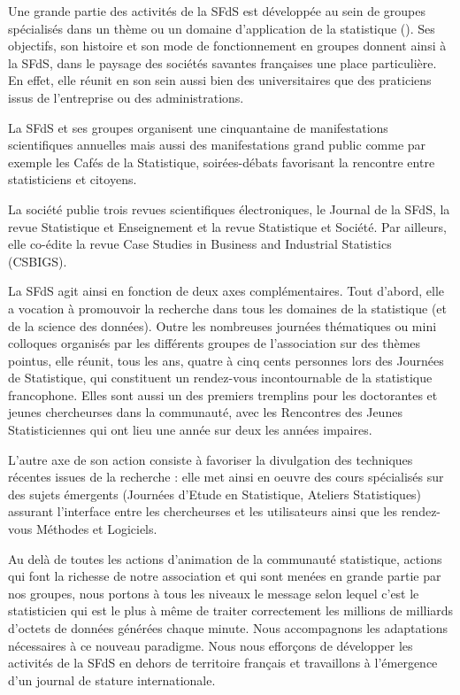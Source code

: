 Une grande partie des activit\'es de la SFdS est d\'evelopp\'ee au sein de groupes sp\'ecialis\'es dans un th\`eme ou un domaine d'application de la statistique (). Ses objectifs, son histoire et son mode de fonctionnement en groupes donnent ainsi \`a la SFdS, dans le paysage des soci\'et\'es savantes fran\c{c}aises une place particuli\`ere. En effet, elle r\'eunit en son sein aussi bien des universitaires que des praticiens issus de l'entreprise ou des administrations.

La SFdS et ses groupes organisent une cinquantaine de manifestations scientifiques annuelles mais aussi des manifestations grand public comme par exemple les Caf\'es de la Statistique, soir\'ees-d\'ebats favorisant la rencontre entre statisticiens et citoyens.

La soci\'et\'e publie trois revues scientifiques \'electroniques, le Journal de la SFdS, la revue Statistique et Enseignement et la revue Statistique 
et Soci\'et\'e. Par ailleurs, elle co-\'edite la revue Case Studies in Business and Industrial Statistics (CSBIGS).

La SFdS agit ainsi en fonction de deux axes compl\'ementaires. Tout d'abord, elle a vocation \`a promouvoir la recherche dans tous les domaines de la statistique (et de la science des donn\'ees). Outre les nombreuses journ\'ees th\'ematiques ou mini colloques organis\'es par les diff\'erents groupes de l'association sur des th\`emes pointus, elle r\'eunit, tous les ans, quatre \`a cinq cents personnes lors des Journ\'ees de Statistique, qui constituent un rendez-vous incontournable de la statistique francophone. Elles sont aussi un des premiers tremplins pour les doctorant\mp es et jeunes chercheur\mp ses dans la communaut\'e, avec les Rencontres des Jeunes Statisticien\mp nes qui ont lieu une ann\'ee sur deux les ann\'ees impaires.

L'autre axe de son action consiste \`a favoriser la divulgation des techniques r\'ecentes issues de la recherche : elle met ainsi en oeuvre des cours sp\'ecialis\'es sur des sujets \'emergents (Journ\'ees d'Etude en Statistique, Ateliers Statistiques) assurant l'interface entre les chercheur\mp ses et les utilisateurs ainsi que les rendez-vous M\'ethodes et Logiciels.

Au del\`a de toutes les actions d'animation de la communaut\'e statistique, actions qui font la richesse de notre association et qui sont men\'ees en 
grande partie par nos groupes, nous portons \`a tous les niveaux le message selon lequel c'est le statisticien qui est le plus \`a m\^eme de traiter correctement les millions de milliards d’octets de donn\'ees g\'en\'er\'ees chaque minute. Nous accompagnons les adaptations n\'ecessaires \`a ce nouveau paradigme. Nous nous effor\c{c}ons de d\'evelopper les activit\'es de la SFdS en dehors de territoire fran\c{c}ais et travaillons \`a l'\'emergence d'un journal de stature internationale.

